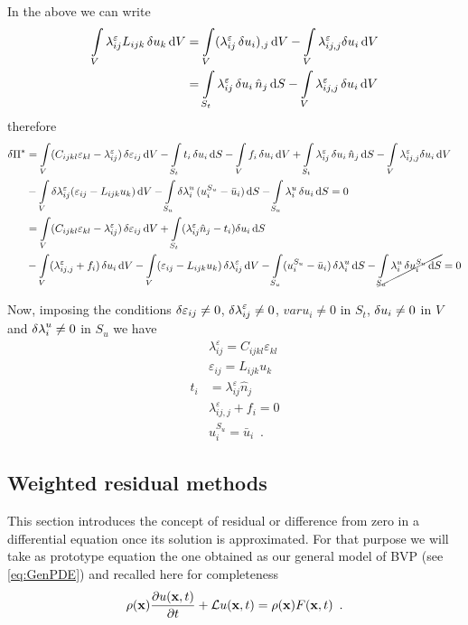 In the above we can write
\begin{align*}
\int\limits_V \lambda_{ij}^\varepsilon L_{ijk}\var{u_k}\dd{V} & = \int\limits_V (\lambda_{ij}^\varepsilon \var{u_i})_{,j}\dd{V} - \int\limits_V \lambda_{ij,j}^\varepsilon \delta {u_i}\dd{V}\\
& = \int\limits_{S_t} \lambda_{ij}^\varepsilon \var{u_i}\hat {n}_j\dd{S}  - \int\limits_V \lambda_{ij,j}^\varepsilon \var{u_i}\dd{V}
\end{align*}
therefore
\begin{align*}
\delta \Pi^* &= \int\limits_V (C_{ijkl}\varepsilon_{kl} - \lambda_{ij}^\varepsilon) \var{\varepsilon}_{ij}\dd{V} - \int\limits_{S_t} t_i \var{u}_i\dd{S} - \int\limits_V f_i \var{u}_i\dd{V} + \int\limits_{S_t} \lambda_{ij}^\varepsilon \var{u_i}\hat{n}_j\dd{S}  - \int\limits_V \lambda_{ij,j}^\varepsilon \delta {u_i}\dd{V}\\
&- \int\limits_V \delta \lambda _{ij}^\varepsilon (\varepsilon_{ij} - L_{ijk} u_k)\dd{V}  - \int\limits_{S_u} \var{\lambda}_i^u (u_i^{S_u} - \bar{u}_i)\dd{S} - \int\limits_{S_u} \lambda_i^u \var{u_i} \dd{S}  = 0\\
&= \int\limits_V (C_{ijkl}\varepsilon_{kl} - \lambda_{ij}^\varepsilon) \var{\varepsilon}_{ij}\dd{V}
+ \int\limits_{S_t} (\lambda_{ij}^\varepsilon \hat{n}_j - t_i)\delta {u_i}\dd{S}\\
&- \int\limits_V (\lambda_{ij,j}^\varepsilon  + f_i) \var{u_i}\dd{V}
- \int\limits_V (\varepsilon_{ij} - L_{ijk} u_k) \var{\lambda} _{ij}^\varepsilon\dd{V}
- \int\limits_{S_u} (u_i^{S_u} - \bar{u}_i) \var{\lambda}_i^u\dd{S}  - \cancel{\int\limits_{S_u} \lambda _i^u \var{u}_i^{S_u}\dd{S}} = 0
\end{align*}

Now, imposing the conditions $\var{\varepsilon}_{ij} \neq 0$, $\var{\lambda}_{ij}^\varepsilon  \neq 0$, $var{u}_i \neq 0$ in $S_t$, $\var{u}_i \neq 0$ in $V$ and $\var{\lambda}_i^u \neq 0$ in $S_u$ we have
\begin{align}
&\lambda_{ij}^\varepsilon  = C_{ijkl} \varepsilon_{kl}\\
&\varepsilon_{ij} = L_{ijk} u_k\\
t_i &= \lambda_{ij}^\varepsilon \hat{n}_j\\
&\lambda_{ij,j}^\varepsilon  + {f_i} = 0\\
&u_i^{S_u} = \bar{u}_i \enspace .
\end{align}

\subsection{Weighted residual methods}
This section introduces the concept of residual or difference from zero in a differential equation once its solution is approximated. For that purpose we will take as prototype equation the one obtained as our general model of BVP (see \cref{eq:GenPDE}) and recalled here for completeness
\begin{equation}
\rho(\vb x) \pdv{u(\vb x, t)}{t} + \mathcal{L}u(\vb x, t) = \rho (\vb x)F(\vb x, t) \enspace .
\label{eq:GenPDE2}
\end{equation}

